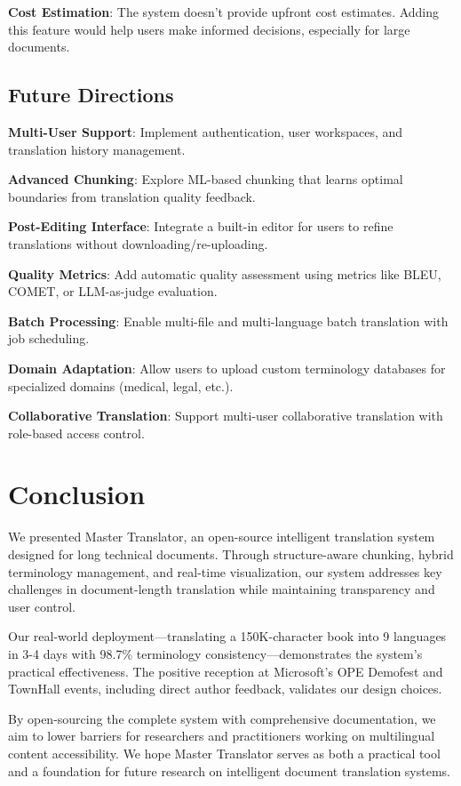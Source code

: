 \documentclass[11pt]{article}
\begin{document}
\textbf{Cost Estimation}: The system doesn't provide upfront cost estimates. Adding this feature would help users make informed decisions, especially for large documents.

\subsection{Future Directions}

\textbf{Multi-User Support}: Implement authentication, user workspaces, and translation history management.

\textbf{Advanced Chunking}: Explore ML-based chunking that learns optimal boundaries from translation quality feedback.

\textbf{Post-Editing Interface}: Integrate a built-in editor for users to refine translations without downloading/re-uploading.

\textbf{Quality Metrics}: Add automatic quality assessment using metrics like BLEU, COMET, or LLM-as-judge evaluation.

\textbf{Batch Processing}: Enable multi-file and multi-language batch translation with job scheduling.

\textbf{Domain Adaptation}: Allow users to upload custom terminology databases for specialized domains (medical, legal, etc.).

\textbf{Collaborative Translation}: Support multi-user collaborative translation with role-based access control.

\section{Conclusion}

We presented Master Translator, an open-source intelligent translation system designed for long technical documents. Through structure-aware chunking, hybrid terminology management, and real-time visualization, our system addresses key challenges in document-length translation while maintaining transparency and user control.

Our real-world deployment---translating a 150K-character book into 9 languages in 3-4 days with 98.7\% terminology consistency---demonstrates the system's practical effectiveness. The positive reception at Microsoft's OPE Demofest and TownHall events, including direct author feedback, validates our design choices.

By open-sourcing the complete system with comprehensive documentation, we aim to lower barriers for researchers and practitioners working on multilingual content accessibility. We hope Master Translator serves as both a practical tool and a foundation for future research on intelligent document translation systems.
\end{document}
